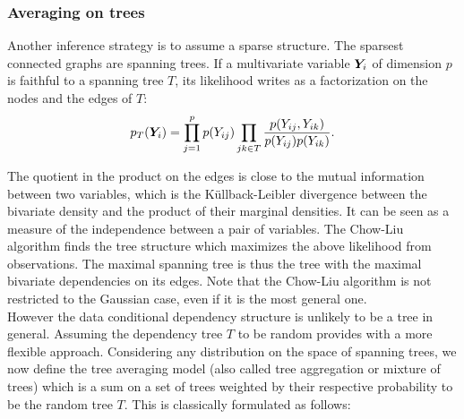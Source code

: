 
 
 \subsubsection{Averaging on trees}\label{tree:aver}

  Another inference strategy is to assume a sparse structure. The sparsest connected graphs are spanning trees. If a multivariate variable ${\boldsymbol{Y}}_i$ of dimension $p$  is faithful to a spanning tree $T $, its likelihood writes as a factorization on the nodes and the edges of $T$:
  $$p_T({\boldsymbol{Y}}_i) = \prod_{j=1}^p p(Y_{ij}) \prod_{jk\in T} \frac{p(Y_{ij},Y_{ik})}{p(Y_{ij})p(Y_{ik})}.$$

The quotient in the product on the edges is close to the mutual information between two variables, which is the Küllback-Leibler divergence between the bivariate density and the product of their marginal densities. It can be seen as a measure of the independence between a pair of variables.   The Chow-Liu algorithm \citep{ChowLiu} finds the tree structure which maximizes the above likelihood from observations. The maximal spanning tree is thus the tree with the maximal bivariate dependencies on its edges. Note that the Chow-Liu algorithm is not restricted to the Gaussian case, even if it is the most general one.\\
 

However the data conditional dependency structure is unlikely to be a tree in general. Assuming the dependency tree $T$ to be random provides with a more flexible approach.  Considering any distribution on the space of spanning trees, we now define the tree averaging model (also called tree aggregation or mixture of trees) which is a sum on a set of trees weighted by their respective probability to be the random tree $T$. This is classically  formulated as follows:


